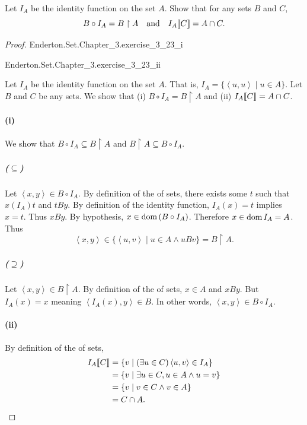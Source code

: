 \documentclass{report}
\begin{document}
Let $I_A$ be the identity function on the set $A$.
Show that for any sets $B$ and $C$,
  $$B \circ I_A = B \restriction A \quad\text{and}\quad
    I_A\!\left\llbracket C\right\rrbracket = A \cap C.$$

\begin{proof}

  \statementpadding

    {Enderton.Set.Chapter\_3.exercise\_3\_23\_i}

    {Enderton.Set.Chapter\_3.exercise\_3\_23\_ii}

  Let $I_A$ be the identity function on the set $A$.
  That is, $I_A = \{\left< u, u \right> \mid u \in A\}$.
  Let $B$ and $C$ be any sets.
  We show that (i) $B \circ I_A = B \restriction A$ and (ii)
    $I_A\!\left\llbracket C\right\rrbracket = A \cap C$.

  \paragraph{(i)}%

    We show that $B \circ I_A \subseteq B \restriction A$ and
      $B \restriction A \subseteq B \circ I_A$.

    \subparagraph{($\subseteq$)}%

      Let $\left< x, y \right> \in B \circ I_A$.
      By definition of the  of sets,
        there exists some $t$ such that $x(I_A)t$ and $tBy$.
      By definition of the identity function, $I_A(x) = t$ implies $x = t$.
      Thus $xBy$.
      By hypothesis, $x \in \mathop{\text{dom}}{(B \circ I_A)}$.
      Therefore $x \in \mathop{\text{dom}}{I_A} = A$.
      Thus
        $$\left< x, y \right>
            \in \{\left< u, v \right> \mid u \in A \land uBv\}
            = B \restriction A.$$

    \subparagraph{($\supseteq$)}%

      Let $\left< x, y \right> \in B \restriction A$.
      By definition of the  of sets,
        $x \in A$ and $xBy$.
      But $I_A(x) = x$ meaning $\left< I_A(x), y \right> \in B$.
      In other words, $\left< x, y \right> \in B \circ I_A$.

  \paragraph{(ii)}%

    By definition of the  of sets,
      \begin{align*}
        I_A\!\left\llbracket C\right\rrbracket
          & = \{v \mid (\exists u \in C) \left< u, v \right> \in I_A\} \\
          & = \{v \mid \exists u \in C, u \in A \land u = v\} \\
          & = \{v \mid v \in C \land v \in A\} \\
          & = C \cap A.
      \end{align*}

\end{proof}
\end{document}
